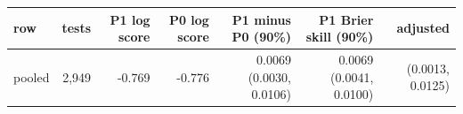 \begin{tabular}{lrrrrrr}
\toprule
row & tests & P1 log score & P0 log score & P1 minus P0 (90\%) & P1 Brier skill (90\%) & adjusted \\
\midrule
pooled & 2,949 & -0.769 & -0.776 & 0.0069 (0.0030, 0.0106) & 0.0069 (0.0041, 0.0100) & (0.0013, 0.0125) \\

\end{tabular}
